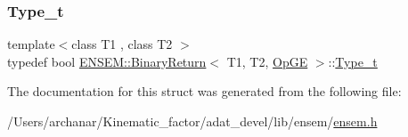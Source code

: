 \mbox{\label{structENSEM_1_1BinaryReturn_3_01T1_00_01T2_00_01OpGE_01_4_a8b2ef4a5b38d3f7cb5dc26a1fb4bdb89}} 
\subsubsection{\texorpdfstring{Type\_t}{Type\_t}\hspace{0.1cm}{\footnotesize\ttfamily [2/2]}}
{\footnotesize\ttfamily template$<$class T1 , class T2 $>$ \\
typedef bool \mbox{\hyperlink{structENSEM_1_1BinaryReturn}{E\+N\+S\+E\+M\+::\+Binary\+Return}}$<$ T1, T2, \mbox{\hyperlink{structENSEM_1_1OpGE}{Op\+GE}} $>$\+::\mbox{\hyperlink{structENSEM_1_1BinaryReturn_3_01T1_00_01T2_00_01OpGE_01_4_a8b2ef4a5b38d3f7cb5dc26a1fb4bdb89}{Type\+\_\+t}}}



The documentation for this struct was generated from the following file\+:\begin{DoxyCompactItemize}
\item 
/\+Users/archanar/\+Kinematic\+\_\+factor/adat\+\_\+devel/lib/ensem/\mbox{\hyperlink{lib_2ensem_2ensem_8h}{ensem.\+h}}\end{DoxyCompactItemize}
